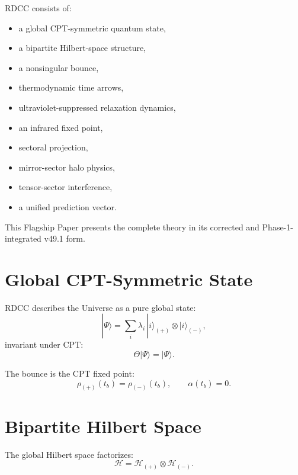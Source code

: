 \documentclass[11pt,a4paper]{article}
\begin{document}
RDCC consists of:
\begin{itemize}[leftmargin=0.8cm]
  \item a global CPT-symmetric quantum state,
  \item a bipartite Hilbert-space structure,
  \item a nonsingular bounce,
  \item thermodynamic time arrows,
  \item ultraviolet-suppressed relaxation dynamics,
  \item an infrared fixed point,
  \item sectoral projection,
  \item mirror-sector halo physics,
  \item tensor-sector interference,
  \item a unified prediction vector.
\end{itemize}

This Flagship Paper presents the complete theory in its corrected and
Phase-1-integrated v49.1 form.

\section{Global CPT-Symmetric State}

RDCC describes the Universe as a pure global state:
\begin{equation}
|\Psi\rangle
=
\sum_i \lambda_i\,|i\rangle_{(+)} \otimes |i\rangle_{(-)},
\end{equation}
invariant under CPT:
\begin{equation}
\Theta|\Psi\rangle = |\Psi\rangle.
\end{equation}

The bounce is the CPT fixed point:
\begin{equation}
\rho_{(+)}(t_b) = \rho_{(-)}(t_b),
\qquad
\alpha(t_b) = 0.
\end{equation}

\section{Bipartite Hilbert Space}

The global Hilbert space factorizes:
\begin{equation}
\mathcal{H}
=
\mathcal{H}_{(+)} \otimes \mathcal{H}_{(-)}.
\end{equation}
\end{document}

